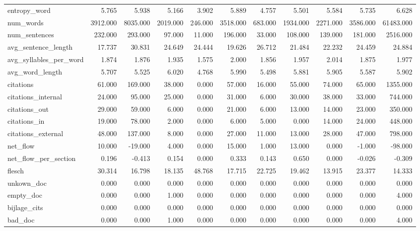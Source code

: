 \begin{tabular}{lrrrrrrrrrr}
\cline{1-11}
entropy\_word & 5.765 & 5.938 & 5.166 & 3.902 & 5.889 & 4.757 & 5.501 & 5.584 & 5.735 & 6.628 \\
\cline{1-11}
num\_words & 3912.000 & 8035.000 & 2019.000 & 246.000 & 3518.000 & 683.000 & 1934.000 & 2271.000 & 3586.000 & 61483.000 \\
\cline{1-11}
num\_sentences & 232.000 & 293.000 & 97.000 & 11.000 & 196.000 & 33.000 & 108.000 & 139.000 & 181.000 & 2516.000 \\
\cline{1-11}
avg\_sentence\_length & 17.737 & 30.831 & 24.649 & 24.444 & 19.626 & 26.712 & 21.484 & 22.232 & 24.459 & 24.884 \\
\cline{1-11}
avg\_syllables\_per\_word & 1.874 & 1.876 & 1.935 & 1.575 & 2.000 & 1.856 & 1.957 & 2.014 & 1.875 & 1.977 \\
\cline{1-11}
avg\_word\_length & 5.707 & 5.525 & 6.020 & 4.768 & 5.990 & 5.498 & 5.881 & 5.905 & 5.587 & 5.902 \\
\cline{1-11}
citations & 61.000 & 169.000 & 38.000 & 0.000 & 57.000 & 16.000 & 55.000 & 74.000 & 65.000 & 1355.000 \\
\cline{1-11}
citations\_internal & 24.000 & 95.000 & 25.000 & 0.000 & 31.000 & 6.000 & 30.000 & 38.000 & 33.000 & 744.000 \\
\cline{1-11}
citations\_out & 29.000 & 59.000 & 6.000 & 0.000 & 21.000 & 6.000 & 13.000 & 14.000 & 23.000 & 350.000 \\
\cline{1-11}
citations\_in & 19.000 & 78.000 & 2.000 & 0.000 & 6.000 & 5.000 & 0.000 & 14.000 & 24.000 & 448.000 \\
\cline{1-11}
citations\_external & 48.000 & 137.000 & 8.000 & 0.000 & 27.000 & 11.000 & 13.000 & 28.000 & 47.000 & 798.000 \\
\cline{1-11}
net\_flow & 10.000 & -19.000 & 4.000 & 0.000 & 15.000 & 1.000 & 13.000 & 0.000 & -1.000 & -98.000 \\
\cline{1-11}
net\_flow\_per\_section & 0.196 & -0.413 & 0.154 & 0.000 & 0.333 & 0.143 & 0.650 & 0.000 & -0.026 & -0.309 \\
\cline{1-11}
flesch & 30.314 & 16.798 & 18.135 & 48.768 & 17.715 & 22.725 & 19.462 & 13.915 & 23.377 & 14.333 \\
\cline{1-11}
unkown\_doc & 0.000 & 0.000 & 0.000 & 0.000 & 0.000 & 0.000 & 0.000 & 0.000 & 0.000 & 0.000 \\
\cline{1-11}
empty\_doc & 0.000 & 0.000 & 1.000 & 0.000 & 0.000 & 0.000 & 0.000 & 0.000 & 0.000 & 4.000 \\
\cline{1-11}
bijlage\_cits & 0.000 & 0.000 & 0.000 & 0.000 & 0.000 & 0.000 & 0.000 & 0.000 & 0.000 & 0.000 \\
\cline{1-11}
bad\_doc & 0.000 & 0.000 & 1.000 & 0.000 & 0.000 & 0.000 & 0.000 & 0.000 & 0.000 & 4.000 \\
\cline{1-11}
\bottomrule
\end{tabular}
